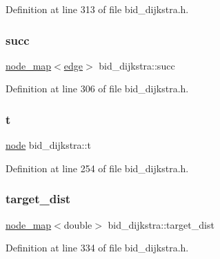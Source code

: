 Definition at line 313 of file bid\+\_\+dijkstra.\+h.

\mbox{\label{classbid__dijkstra_a7379d185faf9af3820b8292676f9d88a}} 
\subsubsection{\texorpdfstring{succ}{succ}}
{\footnotesize\ttfamily \mbox{\hyperlink{classnode__map}{node\+\_\+map}}$<$\mbox{\hyperlink{classedge}{edge}}$>$ bid\+\_\+dijkstra\+::succ\hspace{0.3cm}{\ttfamily [private]}}



Definition at line 306 of file bid\+\_\+dijkstra.\+h.

\mbox{\label{classbid__dijkstra_a9370a71076d7807d1f3963e6dad9897e}} 
\subsubsection{\texorpdfstring{t}{t}}
{\footnotesize\ttfamily \mbox{\hyperlink{classnode}{node}} bid\+\_\+dijkstra\+::t\hspace{0.3cm}{\ttfamily [private]}}



Definition at line 254 of file bid\+\_\+dijkstra.\+h.

\mbox{\label{classbid__dijkstra_a7a46fe8fe075d798eaca14b37aa15c0d}} 
\subsubsection{\texorpdfstring{target\+\_\+dist}{target\_dist}}
{\footnotesize\ttfamily \mbox{\hyperlink{classnode__map}{node\+\_\+map}}$<$double$>$ bid\+\_\+dijkstra\+::target\+\_\+dist\hspace{0.3cm}{\ttfamily [private]}}



Definition at line 334 of file bid\+\_\+dijkstra.\+h.

